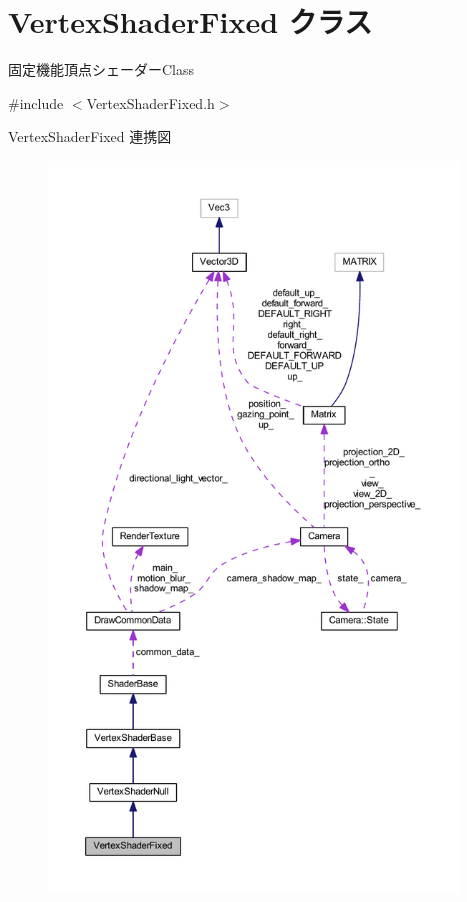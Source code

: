 \hypertarget{class_vertex_shader_fixed}{}\section{Vertex\+Shader\+Fixed クラス}
\label{class_vertex_shader_fixed}


固定機能頂点シェーダー\+Class  




{\ttfamily \#include $<$Vertex\+Shader\+Fixed.\+h$>$}



Vertex\+Shader\+Fixed 連携図\nopagebreak
\begin{figure}[H]
\begin{center}
\leavevmode
\includegraphics[height=550pt]{class_vertex_shader_fixed__coll__graph}
\end{center}
\end{figure}
